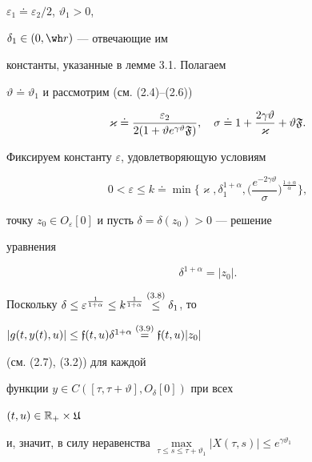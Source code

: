 $\varepsilon_1\doteq\varepsilon_2/2$, $\vartheta _1>0$,


$\delta_1\in(0,\wh r)$ --- отвечающие им


константы, указанные в лемме 3.1. Полагаем


$\vartheta\doteq\vartheta_1$ и рассмотрим (см. (2.4)--(2.6))


\begin{equation}


{\varkappa}\doteq\frac{\varepsilon_2}{2(1+\vartheta


e^{\gamma\vartheta}\frak F)}, \quad \sigma \doteq 1+


\frac{2\gamma\vartheta}{\varkappa}+\vartheta\frak F.


\end{equation}





Фиксируем константу $\varepsilon$, удовлетворяющую условиям


\begin{equation}


0<\varepsilon\le k\doteq\min\bigg\{\varkappa,\delta_1^{1+\alpha},


\bigg(\frac{e^{-2\gamma \vartheta }}{\sigma}\bigg)^{\frac{1+\alpha}{\alpha}}


\bigg\},


\end{equation}


точку $z_0\in O_\varepsilon[0]$ и пусть $\delta=\delta(z_0)>0$ --- решение 


уравнения


\begin{equation}


\delta^{1+\alpha}=|z_0|.


\end{equation}


Поскольку $\delta\le\varepsilon^{\frac{1}{1+\alpha}}


\le k^{\frac{1}{1+\alpha}}


\up{(3.8)}{\le}\delta_1$, то 


$|g(t,y(t),u)|\le


\frak f(t,u)\delta^{1+\alpha}\up{(3.9)}{=}\frak f(t,u)|z_0|$


(см. (2.7), (3.2)) для каждой


функции $y\in C([\tau,\tau+\vartheta],O_{\delta}[0])$ при всех


$(t,u)\in\Bbb R_+\times\frak U$ 


и, значит, в силу неравенства $\max\limits_{\tau\le


s\le\tau+\vartheta_1}|X(\tau,s)|\le e^{\gamma\vartheta_1}$


